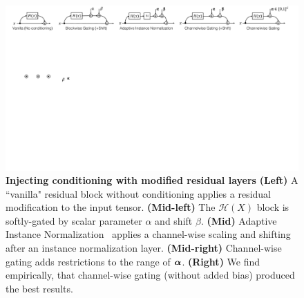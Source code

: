 \begin{figure}[t]
    \centering
    \includegraphics[width=1.\linewidth]{paper_images/arch_gate3.pdf}
    \caption{
    {\bf Injecting conditioning with modified residual layers} {\bf (Left)} A ``vanilla" residual block without conditioning applies a residual modification to the input tensor. {\bf (Mid-left)} The $\mathcal{H}(X)$ block is softly-gated by scalar parameter $\alpha$ and shift $\beta$. {\bf (Mid)} Adaptive Instance Normalization~\cite{huang2017arbitrary} applies a channel-wise scaling and shifting after an instance normalization layer. {\bf (Mid-right)} Channel-wise gating adds restrictions to the range of $\mbox{\boldmath $\alpha$}$. {\bf (Right)} We find empirically, that channel-wise gating (without added bias) produced the best results.\label{fig:arch-gate}
    \vspace{-2mm}
    }
\end{figure}


